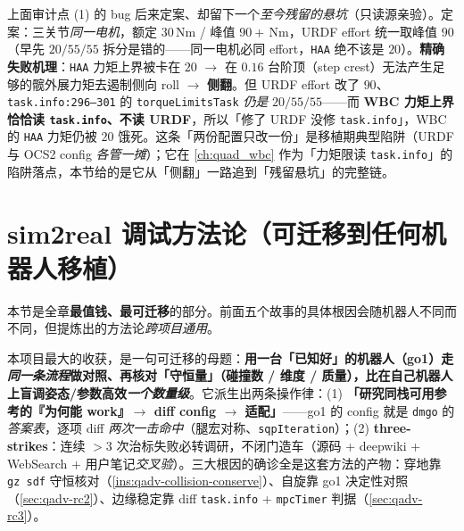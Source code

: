 \begin{pitfall}\label{pit:qadv-torque-task-vs-urdf}
上面审计点 (1) 的 bug 后来定案、却留下一个\emph{至今残留的悬坑}（只读源亲验）。定案：三关节\emph{同一电机}，额定 $30$\,Nm / 峰值 $90+$\,Nm，URDF effort 统一取峰值 \textbf{$90$}（早先 $20/55/55$ 拆分是错的——同一电机必同 effort，\texttt{HAA} 绝不该是 $20$）。\textbf{精确失败机理}：\texttt{HAA} 力矩上界被卡在 $20$ $\to$ 在 $0.16$ 台阶顶（step crest）无法产生足够的髋外展力矩去遏制侧向 roll $\to$ \textbf{侧翻}。但 URDF effort 改了 $90$、\texttt{task.\allowbreak info:296--301} 的 \texttt{torqueLimitsTask} \emph{仍是} $20/55/55$——而 \textbf{WBC 力矩上界恰恰读 \texttt{task.info}、不读 URDF}，所以「修了 URDF 没修 \texttt{task.info}」，WBC 的 \texttt{HAA} 力矩仍被 $20$ 饿死。这条「两份配置只改一份」是移植期典型陷阱（URDF 与 OCS2 config \emph{各管一摊}）；它在 \cref{ch:quad_wbc} 作为「力矩限读 \texttt{task.info}」的陷阱落点，本节给的是它从「侧翻」一路追到「残留悬坑」的完整链。
\end{pitfall}

\section{sim2real 调试方法论（可迁移到任何机器人移植）}
\label{sec:qadv-method}

本节是全章\textbf{最值钱、最可迁移}的部分。前面五个故事的具体根因会随机器人不同而不同，但提炼出的方法论\emph{跨项目通用}。

\begin{insight}\label{ins:qadv-method-core}
本项目最大的收获，是一句可迁移的母题：\textbf{用一台「已知好」的机器人（go1）走\emph{同一条流程}做对照、再核对「守恒量」（碰撞数 / 维度 / 质量），比在自己机器人上盲调姿态/参数高效\emph{一个数量级}}。它派生出两条操作律：(1) \textbf{「研究同栈可用参考的『为何能 work』$\to$ diff config $\to$ 适配」}——go1 的 config 就是 \texttt{dmgo} 的\emph{答案表}，逐项 diff \emph{两次一击命中}（腿宏对称、\texttt{sqpIteration}）；(2) \textbf{three-strikes}：连续 $>3$ 次治标失败必转调研，不闭门造车（源码 + deepwiki + WebSearch + 用户笔记\emph{交叉验}）。三大根因的确诊全是这套方法的产物：穿地靠 \texttt{gz sdf} 守恒核对（\cref{ins:qadv-collision-conserve}）、自旋靠 go1 决定性对照（\cref{sec:qadv-rc2}）、边缘稳定靠 diff \texttt{task.info} + \texttt{mpcTimer} 判据（\cref{sec:qadv-rc3}）。
\end{insight}

